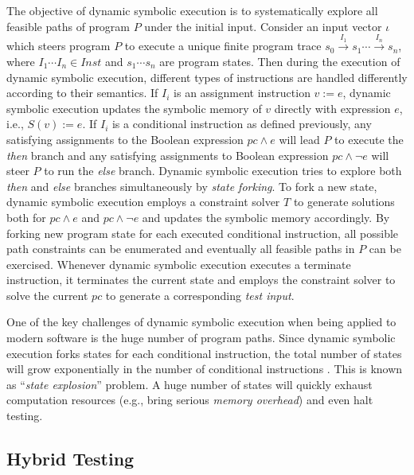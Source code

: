 The objective of dynamic symbolic execution is to systematically
explore all feasible paths of program $P$ under the initial input.
Consider an input vector $\iota$ which steers program $P$ to execute a
unique finite program trace
$s_0\xrightarrow{I_1}s_1\cdots\xrightarrow{I_n}s_n$, where $I_1\cdots
I_n\in Inst$ and $s_1\cdots s_n$ are program states. Then during the
execution of dynamic symbolic execution, different types of
instructions are handled differently according to their semantics. If
$I_i$ is an assignment instruction $v:=e$, dynamic symbolic execution
updates the symbolic memory of $v$ directly with expression $e$, i.e.,
$S(v):= e$. If $I_i$ is a conditional instruction as defined
previously, any satisfying assignments to the Boolean expression
$pc\wedge e$ will lead $P$ to execute the \textit{then} branch and any
satisfying assignments to Boolean expression $pc\wedge\neg e$ will
steer $P$ to run the \textit{else} branch. Dynamic symbolic execution
tries to explore both \textit{then} and \textit{else} branches
simultaneously by \textit{state forking}. To fork a new state, dynamic
symbolic execution employs a constraint solver $T$ to generate
solutions both for $pc\wedge e$ and $pc\wedge\neg e$ and updates the
symbolic memory accordingly. By forking new program state for each
executed conditional instruction, all possible path constraints can be
enumerated and eventually all feasible paths in $P$ can be exercised.
Whenever dynamic symbolic execution executes a terminate instruction,
it terminates the current state and employs the constraint solver to
solve the current $pc$ to generate a corresponding \textit{test input}.

One of the key challenges of dynamic symbolic execution when being
applied to modern software is the huge number of program paths. Since
dynamic symbolic execution forks states for each conditional
instruction, the total number of states will grow exponentially in the
number of conditional instructions \cite{cadar2013symbolic}. This is
known as ``\textit{state explosion}'' problem. A huge number of states
will quickly exhaust computation resources (e.g., bring serious
\textit{memory overhead}) and even halt testing.



\subsection{Hybrid Testing}

